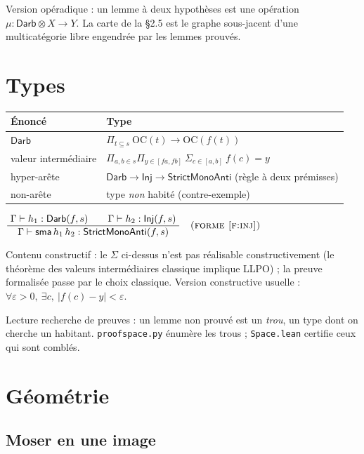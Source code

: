 \documentclass[11pt,a4paper]{article}
\theoremstyle{plain}
\theoremstyle{definition}
\theoremstyle{remark}
\newcommand{\Darb}{\mathsf{Darb}}
\newcommand{\Inj}{\mathsf{Inj}}
\newcommand{\SMA}{\mathsf{StrictMonoAnti}}
\begin{document}
\smallskip
\noindent Version opéradique : un lemme à deux hypothèses est une opération
$\mu : \Darb\otimes X \to Y$. La carte de la \S2.5 est le graphe sous-jacent d'une
multicatégorie libre engendrée par les lemmes prouvés.

\section{Types}

\begin{center}
\begin{tabular}{@{}ll@{}}
\toprule
Énoncé & Type\\
\midrule
$\Darb$ & $\Pi_{t\subseteq s}\ \mathrm{OC}(t)\to \mathrm{OC}(f(t))$\\
valeur intermédiaire & $\Pi_{a,b\in s}\Pi_{y\in[f a,f b]}\ \Sigma_{c\in[a,b]}\ f(c)=y$\\
hyper-arête & $\Darb \to \Inj \to \SMA$ (règle à deux prémisses)\\
non-arête & type \emph{non} habité (contre-exemple)\\
\bottomrule
\end{tabular}
\end{center}

\begin{center}
$\dfrac{\ \Gamma\vdash h_1:\Darb(f,s)\qquad \Gamma\vdash h_2:\Inj(f,s)\ }
{\ \Gamma\vdash \mathsf{sma}\,h_1\,h_2:\SMA(f,s)\ }\quad\textsc{(forme~\ref{f:inj})}$
\end{center}

\noindent Contenu constructif : le $\Sigma$ ci-dessus n'est pas réalisable
constructivement (le théorème des valeurs intermédiaires classique implique LLPO) ; la
preuve formalisée passe par le choix classique. Version constructive usuelle :
$\forall\varepsilon>0,\ \exists c,\ |f(c)-y|<\varepsilon$.

\smallskip
\noindent Lecture \og{}recherche de preuves\fg{} : un lemme non prouvé est un \emph{trou}, un type
dont on cherche un habitant. \texttt{proofspace.py} énumère les trous ;
\texttt{Space.lean} certifie ceux qui sont comblés.

\section{Géométrie}

\subsection{Moser en une image}
\end{document}
